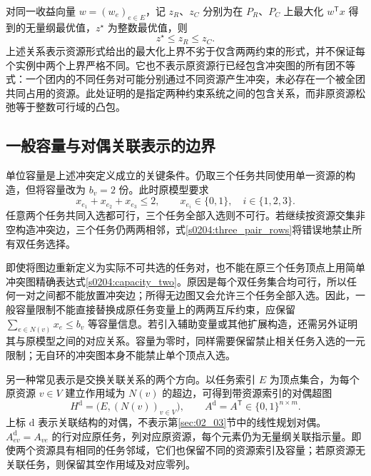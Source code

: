 对同一收益向量 $w=(w_e)_{e\in E}$，记 $z_R$、$z_C$ 分别为在 $P_R$、$P_C$ 上最大化 $w^{\mathsf T}x$ 得到的无量纲最优值，$z^\star$ 为整数最优值，则
\begin{equation}
 z^\star\leq z_R\leq z_C.
 \label{s0204:relaxation_bounds}
\end{equation}
上述关系表示资源形式给出的最大化上界不劣于仅含两两约束的形式，并不保证每个实例中两个上界严格不同。它也不表示原资源行已经包含冲突图的所有团不等式：一个团内的不同任务对可能分别通过不同资源产生冲突，未必存在一个被全团共同占用的资源。此处证明的是指定两种约束系统之间的包含关系，而非原资源松弛等于整数可行域的凸包。

\subsection{一般容量与对偶关联表示的边界}

单位容量是上述冲突定义成立的关键条件。仍取三个任务共同使用单一资源的构造，但将容量改为 $b_v=2$ 份。此时原模型要求
\begin{equation}
 x_{e_1}+x_{e_2}+x_{e_3}\leq2,
 \qquad x_{e_i}\in\{0,1\},\quad i\in\{1,2,3\}.
 \label{s0204:capacity_two}
\end{equation}
任意两个任务共同入选都可行，三个任务全部入选则不可行。若继续按资源交集非空构造冲突边，三个任务仍两两相邻，式\eqref{s0204:three_pair_rows}将错误地禁止所有双任务选择。

即使将图边重新定义为实际不可共选的任务对，也不能在原三个任务顶点上用简单冲突图精确表达式\eqref{s0204:capacity_two}。原因是每个双任务集合均可行，所以任何一对之间都不能放置冲突边；所得无边图又会允许三个任务全部入选。因此，一般容量限制不能直接替换成原任务变量上的两两互斥约束，应保留 $\sum_{e\in N(v)}x_e\leq b_v$ 等容量信息。若引入辅助变量或其他扩展构造，还需另外证明其与原模型之间的对应关系。容量为零时，同样需要保留禁止相关任务入选的一元限制；无自环的冲突图本身不能禁止单个顶点入选。

另一种常见表示是交换关联关系的两个方向。以任务索引 $E$ 为顶点集合，为每个原资源 $v\in V$ 建立作用域为 $N(v)$ 的超边，可得到带资源索引的对偶超图
\begin{equation}
 H^{\mathrm d}=\bigl(E,(N(v))_{v\in V}\bigr),
 \qquad
 A^{\mathrm d}=A^{\mathsf T}\in\{0,1\}^{n\times m}.
 \label{s0204:dual_hypergraph}
\end{equation}
上标 $\mathrm d$ 表示关联结构的对偶，不表示第\ref{sec:02_03}节中的线性规划对偶。$A^{\mathrm d}_{ev}=A_{ve}$ 的行对应原任务，列对应原资源，每个元素仍为无量纲关联指示量。即使两个资源具有相同的任务邻域，它们也保留不同的资源索引及容量；若原资源无关联任务，则保留其空作用域及对应零列。

